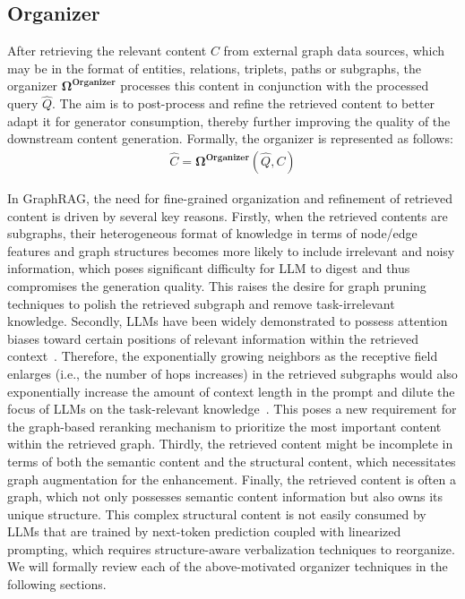 \subsection{Organizer}\label{sec:organizer}
After retrieving the relevant content $C$ from external graph data sources, which may be in the format of entities, relations, triplets, paths or subgraphs, the organizer $\boldsymbol{\Omega}^{\textbf{Organizer}}$ processes this content in conjunction with the processed query $\hat{Q}$. The aim is to post-process and refine the retrieved content to better adapt it for generator consumption, thereby further improving the quality of the downstream content generation. Formally, the organizer is represented as follows:
\begin{align}
    \hat{C} = \boldsymbol{\Omega}^{\textbf{Organizer}}(\hat{Q}, C)
\end{align}

In GraphRAG, the need for fine-grained organization and refinement of retrieved content is driven by several key reasons. Firstly, when the retrieved contents are subgraphs, their heterogeneous format of knowledge in terms of node/edge features and graph structures becomes more likely to include irrelevant and noisy information, which poses significant difficulty for LLM to digest and thus compromises the generation quality. This raises the desire for graph pruning techniques to polish the retrieved subgraph and remove task-irrelevant knowledge. Secondly, LLMs have been widely demonstrated to possess attention biases toward certain positions of relevant information within the retrieved context~\cite{chen2023understanding}. Therefore, the exponentially growing neighbors as the receptive field enlarges (i.e., the number of hops increases) in the retrieved subgraphs would also exponentially increase the amount of context length in the prompt and dilute the focus of LLMs on the task-relevant knowledge~\cite{shi2023large}. This poses a new requirement for the graph-based reranking mechanism to prioritize the most important content within the retrieved graph. Thirdly, the retrieved content might be incomplete in terms of both the semantic content and the structural content, which necessitates graph augmentation for the enhancement. Finally, the retrieved content is often a graph, which not only possesses semantic content information but also owns its unique structure. This complex structural content is not easily consumed by LLMs that are trained by next-token prediction coupled with linearized prompting, which requires structure-aware verbalization techniques to reorganize. We will formally review each of the above-motivated organizer techniques in the following sections.



